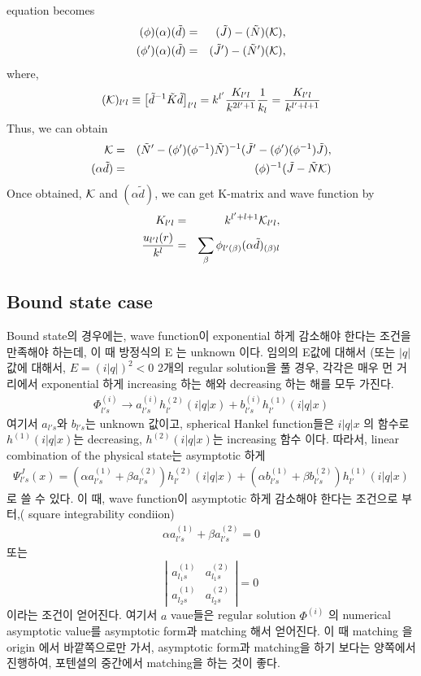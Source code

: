 \documentclass[10pt]{article}
\newcommand{\bea}{\begin{eqnarray}}
\newcommand{\eea}{\end{eqnarray}}
\newcommand{\no}{\nonumber \\}
\begin{document}
equation becomes
\bea
(\phi)(\alpha)(\tilde{d})&=&(\tilde{J})-(\tilde{N})({\cal K})
,\no
(\phi')(\alpha)(\tilde{d})&=&(\tilde{J}')-(\tilde{N}')({\cal K}),\no
\eea
where,
\bea
({\cal K})_{l'l}\equiv
\left[\tilde{d}^{-1}\tilde{K}\tilde{d}\right]_{l'l}
=k^{l'}\frac{K_{l'l}}{k^{2l'+1}}\frac{1}{k_{l}}
=\frac{K_{l'l}}{k^{l'+l+1}}
\eea
Thus, we can obtain
\bea
{\cal K}&=&(\tilde{N}'-(\phi')(\phi^{-1})\tilde{N})^{-1}
           (\tilde{J}'-(\phi')(\phi^{-1})\tilde{J}),\no
({\alpha}\tilde{d})&=&(\phi)^{-1}(\tilde{J}-\tilde{N}{\cal K})              
\eea
Once obtained, ${\cal K}$ and $(\alpha\tilde{d})$,
we can get K-matrix and wave function by
\bea
K_{l'l}&=&k^{l'+l+1}{\cal K}_{l'l},\no
\frac{u_{l'l}(r)}{k^l}&=&
    \sum_{\beta} \phi_{l'(\beta)}(\alpha\tilde{d})_{(\beta)l}
\eea

\subsection{Bound state case}
Bound state의 경우에는, wave function이 exponential 하게 감소해야 한다는 
조건을 만족해야 하는데, 이 때 방정식의 E 는 unknown 이다. 임의의 E값에 대해서 
(또는 $|q|$ 값에 대해서, $E=(i|q|)^2<0$ 2개의 regular solution을 풀 경우,
각각은 매우 먼 거리에서 exponential 하게 increasing 하는 해와 decreasing 하는 해를
모두 가진다.
\bea
\Phi^{(i)}_{l's}\to a^{(i)}_{l's}h^{(2)}_{l'}(i|q|x)+b_{l's}^{(i)} h_{l'}^{(1)}(i|q|x)
\eea   
여기서 $a_{l's}$와 $b_{l's}$는 unknown 값이고, spherical Hankel function들은 
$i|q|x $ 의 함수로 $h^{(1)}(i|q|x)$는 decreasing, $h^{(2)}(i|q|x)$는 increasing 
함수 이다. 따라서, linear combination of the physical state는 
asymptotic 하게 
\bea
\Psi^J_{l's}(x)=(\alpha a^{(1)}_{l's}+\beta a^{(2)}_{l's})h_{l'}^{(2)}(i|q|x)
                      +(\alpha b_{l's}^{(1)}+\beta b^{(2)}_{l's}) h_{l'}^{(1)}(i|q|x)
\eea 
로 쓸 수 있다. 이 때, wave function이 asymptotic 하게 감소해야 한다는 
조건으로 부터,( square integrability condiion)
\bea
\alpha a^{(1)}_{l's}+\beta a^{(2)}_{l's}=0
\eea
또는 
\begin{equation}
\left\vert \begin{array}{cc} a^{(1)}_{l_1 s} & a^{(2)}_{l_1 s} \\
                                     a^{(1)}_{l_2 s} & a^{(2)}_{l_2 s} \end{array} \right\vert =0
\end{equation}
이라는 조건이 얻어진다. 여기서 $a$ vaue들은 regular solution $\Phi^{(i)}$ 의 
numerical asymptotic value를 asymptotic form과 matching 해서 얻어진다.
이 때 matching 을 origin 에서 바깥쪽으로만 가서, asymptotic form과 matching을 
하기 보다는 양쪽에서 진행하여, 포텐셜의 중간에서 matching을 하는 것이 좋다.
\end{document}
